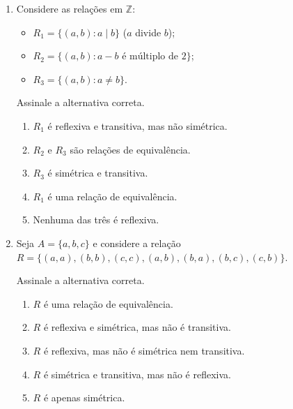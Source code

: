 \documentclass[12pt]{article}
\begin{document}
\begin{enumerate}
\vspace{0.8cm}

\item Considere as relações em $\mathbb{Z}$:
\begin{itemize}
    \item $R_1 = \{(a,b) : a \mid b\}$ ($a$ divide $b$);
    \item $R_2 = \{(a,b) : a - b \text{ é múltiplo de 2}\}$;
    \item $R_3 = \{(a,b) : a \neq b\}$.
\end{itemize}

Assinale a alternativa correta.
\begin{enumerate}[label=\Alph*)]
    \item $R_1$ é reflexiva e transitiva, mas não simétrica.
    \item $R_2$ e $R_3$ são relações de equivalência.
    \item $R_3$ é simétrica e transitiva.
    \item $R_1$ é uma relação de equivalência.
    \item Nenhuma das três é reflexiva.
\end{enumerate}

\vspace{0.8cm}

\item Seja $A = \{a, b, c\}$ e considere a relação $R = \{(a,a),(b,b),(c,c),(a,b),(b,a),(b,c),(c,b)\}$.

Assinale a alternativa correta.
\begin{enumerate}[label=\Alph*)]
    \item $R$ é uma relação de equivalência.
    \item $R$ é reflexiva e simétrica, mas não é transitiva.
    \item $R$ é reflexiva, mas não é simétrica nem transitiva.
    \item $R$ é simétrica e transitiva, mas não é reflexiva.
    \item $R$ é apenas simétrica.
\end{enumerate}

\vspace{0.8cm}


\end{enumerate}
\end{document}

